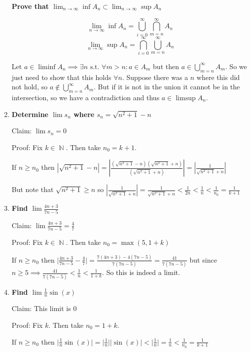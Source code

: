 \documentclass[10pt,a4paper]{article}
\DeclareMathOperator*{\N}{\mathbb{N}}
\begin{document}
\begin{enumerate}
        \textbf{Prove that $\lim_{n \to \infty} \inf A_n \subset \lim_{n \to \infty}\sup A_n$}

        $$\lim_{n \to \infty} \inf A_n = \bigcup_{i=0}^\infty \bigcap_{m=n}^\infty A_n$$
        $$\lim_{n \to \infty} \sup A_n = \bigcap_{i=0}^\infty \bigcup_{m=n}^\infty A_n$$

        Let $a \in \liminf A_n \implies \exists n \text{ s.t. } \forall m > n : a \in A_m $
        but then $a \in \bigcup_{m=n}^\infty A_m$. So we just need to show that this holds $\forall n$. Suppose there was a $n$ where this did not hold, so $a \not\in \bigcup_{m=n}^\infty A_m$. But if it is not in the union it cannot be in the intersection, so we have a contradiction and thus $a \in \limsup A_n$.


    \item \textbf{Determine $\lim s_n$ where $s_n = \sqrt{n^2 +1} -n $ }

        Claim: $\lim s_n  = 0$

        Proof: Fix $k \in \N$. Then take $n_0 = k+1$. 

        If $n \geq n_0$ then $\left\vert \sqrt{n^2 +1} -n \right\vert  = \left\vert \frac{(\sqrt{n^2 +1} -n)(\sqrt{n^2+1} +n)}{(\sqrt{n^2+1} +n)} \right \vert = \left\vert\frac{1}{\sqrt{n^2+1} + n} \right \vert$

        But note that $\sqrt{n^2+1} \geq n$ so $\left\vert\frac{1}{\sqrt{n^2+1} + n} \right \vert  = \frac{1}{\sqrt{n^2+1} + n} < \frac{1}{2n} < \frac{1}{n} < \frac{1}{n_0} = \frac{1}{k+1}$

    \item \textbf{Find $\lim \frac{4n+3}{7n-5}$ }

        Claim: $\lim \frac{4n+3}{7n-5} = \frac{4}{7}$

        Proof: Fix $k \in \N$. Then take $n_0 = \max (5, {1+k})$

        If $n \geq n_0$ then $ \lvert \frac{4n+3}{7n-5}- \frac{4}{7} \rvert = \frac{7(4n+3) - 4(7n-5)}{7(7n-5)} = \frac{41}{7(7n-5)}$
        but since $n \geq 5 \implies \frac{41}{7(7n-5)} < \frac{1}{n} < \frac{1}{1+k}$. So this is indeed a limit.


    \item \textbf{Find $\lim \frac{1}{n}\sin(x)$ }

        Claim: This limit is 0

        Proof: Fix $k$. Then take $n_0 = 1+k$. 

        If $n \geq n_0$ then $\lvert \frac{1}{n}\sin(x) \rvert = \lvert \frac{1}{n} \rvert \lvert \sin(x) \rvert < \lvert \frac{1}{n} \rvert = \frac{1}{n} <  \frac{1}{n_0} = \frac{1}{k+1}$



\end{enumerate}
\end{document}

